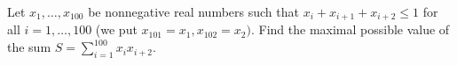 Let $x_1, \ldots , x_{100}$ be nonnegative real numbers such that $x_i + x_{i+1} + x_{i+2} \leq 1$ for all $i = 1, \ldots , 100$ (we put $x_{101 } = x_1, x_{102} = x_2).$ Find the maximal possible value of the sum $S = \sum^{100}_{i=1} x_i x_{i+2}.$